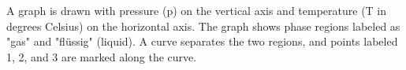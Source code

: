 A graph is drawn with pressure (p) on the vertical axis and temperature (T in degrees Celsius) on the horizontal axis. The graph shows phase regions labeled as "gas" and "flüssig" (liquid). A curve separates the two regions, and points labeled 1, 2, and 3 are marked along the curve.